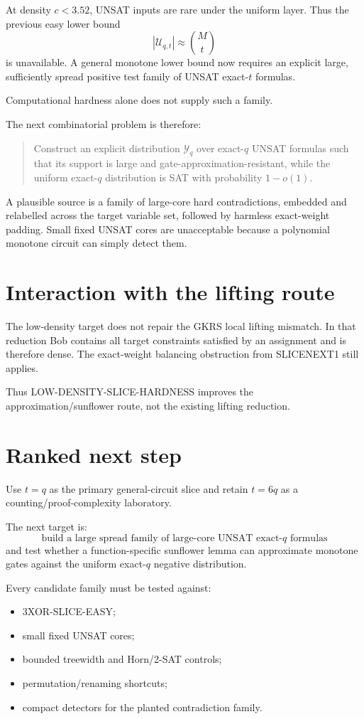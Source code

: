 \documentclass[11pt]{article}
\begin{document}
At density \(c<3.52\), UNSAT inputs are rare under the uniform layer. Thus the previous easy lower bound
\[
|\mathcal U_{q,t}|\approx\binom Mt
\]
is unavailable. A general monotone lower bound now requires an explicit large, sufficiently spread positive test family of UNSAT exact-\(t\) formulas.

Computational hardness alone does not supply such a family.

The next combinatorial problem is therefore:

\begin{quote}
Construct an explicit distribution \(\mathcal Y_q\) over exact-\(q\) UNSAT formulas such that its support is large and gate-approximation-resistant, while the uniform exact-\(q\) distribution is SAT with probability \(1-o(1)\).
\end{quote}

A plausible source is a family of large-core hard contradictions, embedded and relabelled across the target variable set, followed by harmless exact-weight padding. Small fixed UNSAT cores are unacceptable because a polynomial monotone circuit can simply detect them.

\section{Interaction with the lifting route}

The low-density target does not repair the GKRS local lifting mismatch. In that reduction Bob contains all target constraints satisfied by an assignment and is therefore dense. The exact-weight balancing obstruction from SLICENEXT1 still applies.

Thus LOW-DENSITY-SLICE-HARDNESS improves the approximation/sunflower route, not the existing lifting reduction.

\section{Ranked next step}

Use \(t=q\) as the primary general-circuit slice and retain \(t=6q\) as a counting/proof-complexity laboratory.

The next target is:
\[
\boxed{
\text{build a large spread family of large-core UNSAT exact-}q\text{ formulas}
}
\]
and test whether a function-specific sunflower lemma can approximate monotone gates against the uniform exact-\(q\) negative distribution.

Every candidate family must be tested against:
\begin{itemize}
\item[] 3XOR-SLICE-EASY;
\item[] small fixed UNSAT cores;
\item[] bounded treewidth and Horn/2-SAT controls;
\item[] permutation/renaming shortcuts;
\item[] compact detectors for the planted contradiction family.
\end{itemize}
\end{document}
